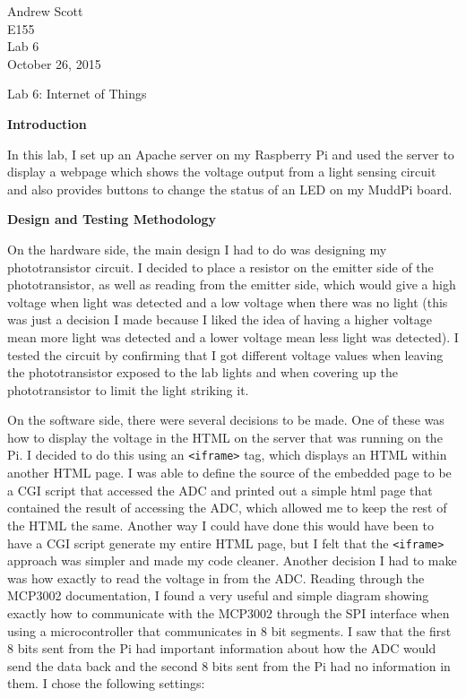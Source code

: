 \documentclass[11pt,letterpaper]{article}
\begin{document}
\begin{flushright}
Andrew Scott\\
E155\\
Lab 6\\
October 26, 2015
\end{flushright}

\begin{center}
Lab 6: Internet of Things
\end{center}

\noindent\textbf{Introduction}

In this lab, I set up an Apache server on my Raspberry Pi and used the server to display a webpage which shows the voltage output from a light sensing circuit and also provides buttons to change the status of an LED on my MuddPi board.

\noindent\textbf{Design and Testing Methodology}

On the hardware side, the main design I had to do was designing my phototransistor circuit. I decided to place a resistor on the emitter side of the phototransistor, as well as reading from the emitter side, which would give a high voltage when light was detected and a low voltage when there was no light (this was just a decision I made because I liked the idea of having a higher voltage mean more light was detected and a lower voltage mean less light was detected). I tested the circuit by confirming that I got different voltage values when leaving the phototransistor exposed to the lab lights and when covering up the phototransistor to limit the light striking it.

On the software side, there were several decisions to be made. One of these was how to display the voltage in the HTML on the server that was running on the Pi. I decided to do this using an  \verb|<iframe>| tag, which displays an HTML within another HTML page. I was able to define the source of the embedded page to be a CGI script that accessed the ADC and printed out a simple html page that contained the result of accessing the ADC, which allowed me to keep the rest of the HTML the same. Another way I could have done this would have been to have a CGI script generate my entire HTML page, but I felt that the \verb|<iframe>| approach was simpler and made my code cleaner. Another decision I had to make was how exactly to read the voltage in from the ADC. Reading through the MCP3002 documentation, I found a very useful and simple diagram showing exactly how to communicate with the MCP3002 through the SPI interface when using a microcontroller that communicates in 8 bit segments. I saw that the first 8 bits sent from the Pi had important information about how the ADC would send the data back and the second 8 bits sent from the Pi had no information in them. I chose the following settings:\\
\end{document}
